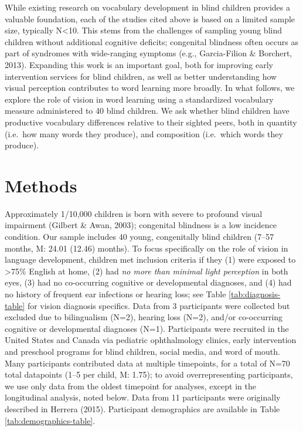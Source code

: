 \documentclass[
  man,floatsintext]{apa6}
\begin{document}
While existing research on vocabulary development in blind children provides a valuable foundation, each of the studies cited above is based on a limited sample size, typically N\textless10. This stems from the challenges of sampling young blind children without additional cognitive deficits; congenital blindness often occurs as part of syndromes with wide-ranging symptoms (e.g., Garcia-Filion \& Borchert, 2013). Expanding this work is an important goal, both for improving early intervention services for blind children, as well as better understanding how visual perception contributes to word learning more broadly. In what follows, we explore the role of vision in word learning using a standardized vocabulary measure administered to 40 blind children. We ask whether blind children have productive vocabulary differences relative to their sighted peers, both in quantity (i.e.~how many words they produce), and composition (i.e.~which words they produce).

\hypertarget{methods}{%
\section{Methods}\label{methods}}

Approximately 1/10,000 children is born with severe to profound visual impairment (Gilbert \& Awan, 2003); congenital blindness is a low incidence condition. Our sample includes 40 young, congenitally blind children (7--57 months, M: 24.01 (12.46) months). To focus specifically on the role of vision in language development, children met inclusion criteria if they (1) were exposed to \textgreater75\% English at home, (2) had \emph{no more than minimal light perception} in both eyes, (3) had no co-occurring cognitive or developmental diagnoses, and (4) had no history of frequent ear infections or hearing loss; see Table \ref{tab:diagnosis-table} for vision diagnosis specifics. Data from 3 participants were collected but excluded due to bilingualism (N=2), hearing loss (N=2), and/or co-occurring cognitive or developmental diagnoses (N=1). Participants were recruited in the United States and Canada via pediatric ophthalmology clinics, early intervention and preschool programs for blind children, social media, and word of mouth. Many participants contributed data at multiple timepoints, for a total of N=70 total datapoints (1--5 per child, M: 1.75); to avoid overrepresenting participants, we use only data from the oldest timepoint for analyses, except in the longitudinal analysis, noted below. Data from 11 participants were originally described in Herrera (2015). Participant demographics are available in Table \ref{tab:demographics-table}.
\end{document}
